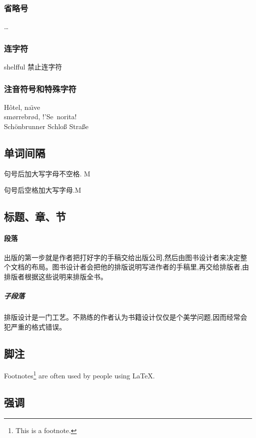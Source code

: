 \documentclass[a4paper,12pt]{article}
\begin{document}
\texteuro

\subsubsection{省略号}

\ldots

\subsubsection{连字符}

shelf\mbox{}ful  禁止连字符

\subsubsection{注音符号和特殊字符}

H\^otel, na\"\i ve\\
sm\o rrebr\o d, !'Se\ norita!\\
Sch\"onbrunner Schlo\ss{}
Stra\ss e

\subsection{单词间隔}

句号后加大写字母不空格. M

句号后空格加大写字母.M

\subsection{标题、章、节}

\paragraph{段落}
出版的第一步就是作者把打好字的手稿交给出版公司,然后由图书设计者来决定整个文档的布局。图书设计者会把他的排版说明写进作者的手稿里,再交给排版者,由排版者根据这些说明来排版全书。

\subparagraph{子段落}

排版设计是一门工艺。不熟练的作者认为书籍设计仅仅是个美学问题,因而经常会犯严重的格式错误。

\subsection{脚注}
Footnotes\footnote{This is a footnote.} are often used by people using \LaTeX.

\subsection{强调}
\end{document}
